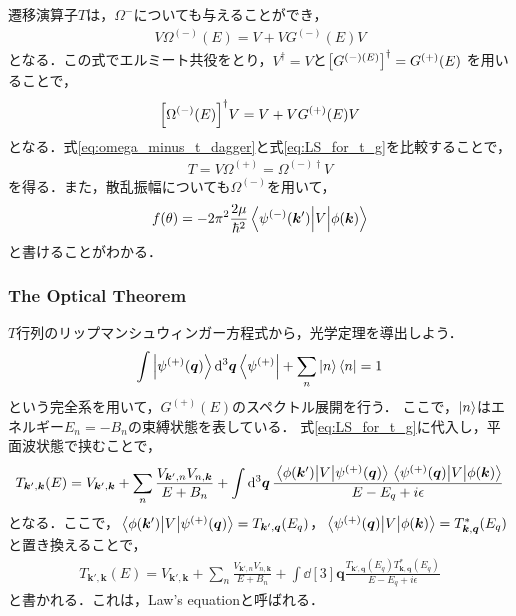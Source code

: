 \documentclass[a4paper,11pt]{ltjsarticle}
\numberwithin{equation}{section}
\begin{document}
遷移演算子$T$は，$\Omega^{-}$についても与えることができ，
\begin{align}\label{eq:omega_minus_t}
  V \Omega^{(-)}(E) = V + V G^{(-)}(E) V
\end{align}
となる．この式でエルミート共役をとり，$V^\dagger = V$と$\qty[G^{(-)(E)}] ^\dagger = G^{(+)}(E) $
を用いることで，
\begin{align}\label{eq:omega_minus_t_dagger}
  \qty[\Omega^{(-)}(E)]^\dagger V = V + V G^{(+)}(E) V
\end{align}
となる．式\ref{eq:omega_minus_t_dagger}と式\ref{eq:LS_for_t_g}を比較することで，
\begin{align}\label{eq:t_for_omega_pm}
  T = V \Omega^{(+)} = \Omega^{(-)\dagger} V
\end{align}
を得る．また，散乱振幅についても$\Omega^{(-)}$を用いて，
\begin{align}
  f(\theta) = - 2\pi^2 \frac{2\mu}{\hbar^2} \mel{\psi^{(-)}(\bm{k}')}{V}{\phi(\bm{k})}
\end{align}
と書けることがわかる．
\subsubsection{The Optical Theorem}
$T$行列のリップマンシュウィンガー方程式から，光学定理を導出しよう．
\begin{align}\label{eq:completeset}
  \int \ket{\psi^{(+)}(\bm{q})} \dd[3]{\bm{q}} \bra{\psi^{(+)}} + \sum_n \ket{n}\bra{n} = 1
\end{align}
という完全系を用いて，$G^{(+)}(E)$のスペクトル展開を行う．
ここで，$\ket{n}$はエネルギー$E_n = - B_n$の束縛状態を表している．
式\ref{eq:LS_for_t_g}に代入し，平面波状態で挟むことで，
\begin{align}\label{eq:spectral_exp_for_t}
  T_{\bm{k}', \bm{k}}(E) = V_{\bm{k}', \bm{k}} + \sum_n \frac{V_{\bm{k}', n} V_{n, \bm{k}}}{E + B_n} + \int \dd[3]{\bm{q}} \frac{\mel{\phi(\bm{k}')}{V}{\psi^{(+)}(\bm{q})}\mel{\psi^{(+)}(\bm{q})}{V}{\phi(\bm{k})}}{E-E_q + i\epsilon}
\end{align}
となる．ここで，$\mel{\phi(\bm{k}')}{V}{\psi^{(+)}(\bm{q})} = T_{\bm{k}', \bm{q}}(E_q)$，$\mel{\psi^{(+)}(\bm{q})}{V}{\phi(\bm{k})} = T_{\bm{k}, \bm{q}}^*(E_q)$と置き換えることで，
\begin{align}\label{eq:spectral_exp_for_t_2}
  T_{\bm{k}', \bm{k}}(E) = V_{\bm{k}', \bm{k}} + \sum_n \frac{V_{\bm{k}', n} V_{n, \bm{k}}}{E + B_n} + \int \dd[3]{\bm{q}} \frac{T_{\bm{k}', \bm{q}}(E_q)T_{\bm{k}, \bm{q}}^*(E_q)}{E-E_q + i\epsilon}
\end{align}
と書かれる．これは，Law's equationと呼ばれる．
\end{document}
